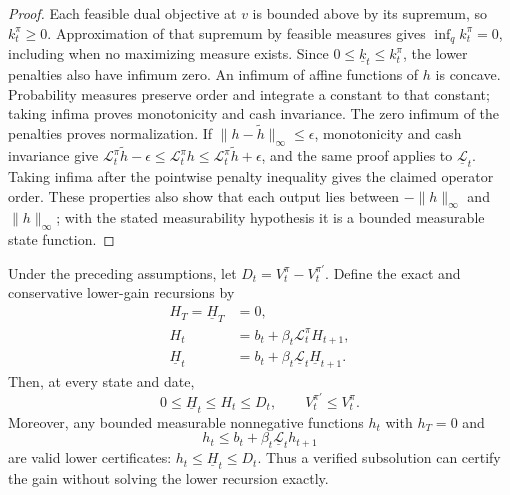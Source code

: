\begin{proof}
Each feasible dual objective at $v$ is bounded above by its supremum,
so $k_t^\pi\ge0$. Approximation of that supremum by feasible measures
gives $\inf_q k_t^\pi=0$, including when no maximizing measure exists.
Since $0\le\underline k_t\le k_t^\pi$, the lower penalties also have
infimum zero. An infimum of affine functions of $h$ is concave.
Probability measures preserve order and integrate a constant to that
constant; taking infima proves monotonicity and cash invariance.
The zero infimum of the penalties proves normalization. If
$\|h-\widetilde h\|_\infty\le\epsilon$, monotonicity and cash invariance
give
$\mathcal L_t^\pi\widetilde h-\epsilon
 \le\mathcal L_t^\pi h
 \le\mathcal L_t^\pi\widetilde h+\epsilon$,
and the same proof applies to $\underline{\mathcal L}_t$.
Taking infima after the pointwise penalty inequality gives the claimed
operator order. These properties also show that each output lies between
$-\|h\|_\infty$ and $\|h\|_\infty$; with the stated measurability
hypothesis it is a bounded measurable state function.
\end{proof}

\begin{theorem}
\label{thm:dynamicgain122}
Under the preceding assumptions, let
$D_t=V_t^\pi-V_t^{\pi'}$. Define the exact and conservative lower-gain
recursions by
\begin{align}
 H_T=\underline H_T&=0,\nonumber\\
 H_t&=b_t+\beta_t\mathcal L_t^\pi H_{t+1},\label{eq:gainrecursion122}\\
 \underline H_t&=b_t+\beta_t
                     \underline{\mathcal L}_t\underline H_{t+1}.
                    \nonumber
\end{align}
Then, at every state and date,
\begin{equation}\label{eq:dynamicgainbound122}
          0\le\underline H_t\le H_t\le D_t,
 \qquad V_t^{\pi'}\le V_t^\pi.
\end{equation}
Moreover, any bounded measurable nonnegative functions $h_t$ with
$h_T=0$ and
\[
 h_t\le b_t+\beta_t\underline{\mathcal L}_t h_{t+1}
\]
are valid lower certificates: $h_t\le\underline H_t\le D_t$.
Thus a verified subsolution can certify the gain without solving the
lower recursion exactly.
\end{theorem}

